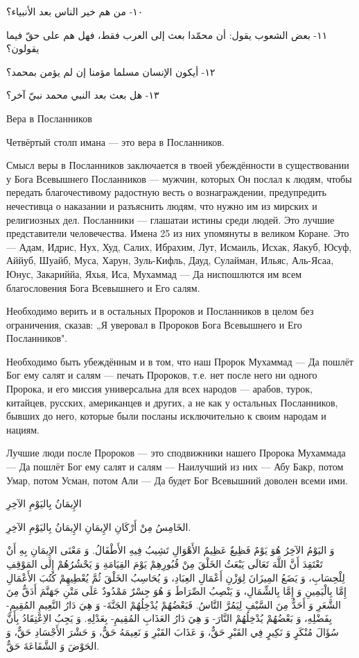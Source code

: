 \documentclass[a5paper]{article}
\begin{document}
١٠- من هم خير الناس بعد الأنبياء؟

١١- بعض الشعوب يقول: أن محمّدا بعث إلى العرب فقط، فهل هم على حقّ فيما يقولون؟

١٢- أيكون الإنسان مسلما مؤمنا إن لم يؤمن بمحمد؟

١٣- هل بعث بعد النبي محمد نبيّ آخر؟

Вера в Посланников

Четвёртый столп имана — это вера в Посланников.

Смысл веры в Посланников заключается в твоей убеждённости в существовании у Бога Всевышнего Посланников — мужчин, которых Он послал к людям, чтобы передать благочестивому радостную весть о вознаграждении, предупредить нечестивца о наказании и разъяснить людям, что нужно им из мирских и религиозных дел. Посланники — глашатаи истины среди людей. Это лучшие представители человечества. Имена 25 из них упомянуты в великом Коране. Это — Адам, Идрис, Нух, Худ, Салих, Ибрахим, Лут, Исмаиль, Исхак, Яакуб, Юсуф, Аййуб, Шуайб, Муса, Харун, Зуль-Кифль, Дауд, Сулайман, Ильяс, Аль-Ясаа, Юнус, Закариййа, Яхья, Иса, Мухаммад — Да ниспошлются им всем благословения Бога Всевышнего и Его салям.

Необходимо верить и в остальных Пророков и Посланников в целом без ограничения, сказав: „Я уверовал в Пророков Бога Всевышнего и Его Посланников".

Необходимо быть убеждённым и в том, что наш Пророк Мухам­мад — Да пошлёт Бог ему салят и салям — печать Пророков, т.е. нет после него ни одного Пророка, и его миссия универсальна для всех народов — арабов, турок, китайцев, русских, американцев и других, а не как у остальных Посланников, бывших до него, которые были посланы исключительно к своим народам и нациям.

Лучшие люди после Пророков — это сподвижники нашего Пророка Мухаммада — Да пошлёт Бог ему салят и салям — Наилучший из них — Абу Бакр, потом Умар, потом Усман, потом Али — Да будет Бог Всевышний доволен всеми ими.

الإِيمَانُ بِاليَوْمِ الآخِرِ

الخَامِسُ مِنْ أَرْكَانِ الإِيمَانِ الإِيمَانُ بِاليَوْمِ الآخِرِ.

وَ اليَوْمُ الآخِرُ هُوَ يَوْمٌ فَظِيعٌ عَظِيمٌ الأَهْوَالِ تَشِيبُ فِيهِ الأَطْفَالُ. وَ مَعْنَى الإِيمَانِ بِهِ أَنْ تَعْتَقِدَ أَنَّ اللَّهَ تَعَالَى يَبْعَثُ الخَلْقَ مِنْ قُبُورِهِمْ يَوْمَ القِيَامَةِ وَ يَحْشُرُهُمْ إِلَى المَوْقِفِ لِلْحِسَابِ، وَ يَضَعُ المِيزَانَ لِوَزْنِ أَعْمَالِ العِبَادِ، وَ يُحَاسِبُ الخَلْقَ ثُمَّ يُعْطِيهِمْ كُتُبَ الأَعْمَالِ إِمَّا بِالْيَمِينِ وَ إِمَّا بِالشِّمَالِ، وَ يَنْصِبُ الصِّرَاطَ وَ هُوَ جِسْرٌ مَمْدُودٌ عَلَى مَتْنِ جَهَنَّمَ أَدَقُّ مِنَ الشَّعَرِ وَ أَحَدُّ مِنَ السَّيْفِ لِيَمُرَّ النَّاسُ. فَبَعْضُهُمْ يُدْخِلُهُمْ الجَنَّةَ- وَ هِيَ دَارُ النَّعِيمِ المُقِيمِ- بِفَضْلِهِ، وَ بَعْضُهُمْ يُدْخِلُهُمْ النَّارَ- وَ هِيَ دَارُ العَذَابِ المُقِيمِ- بِعَدْلِهِ. وَ يَجِبُ الاِعْتِقَادُ بِأَنَّ سُؤَالَ مُنْكَرٍ وَ نَكِيرٍ فِي القَبْرِ حَقٌّ، وَ عَذَابَ القَبْرِ وَ نَعِيمَهُ حَقٌّ، وَ حَشْرَ الأَجْسَادِ حَقٌّ، وَ الحَوْضَ وَ الشَّفَاعَةَ حَقٌّ.
\end{document}
